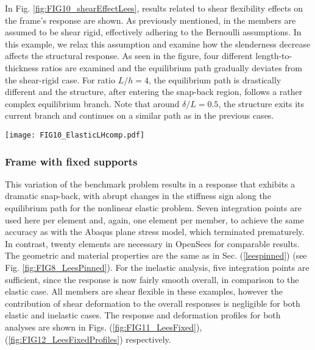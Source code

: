 \begin{figure*}[b]
	\centering
	\qquad
	\caption{Deformation profiles for Lee's frame with pinned supports.}%
	\label{fig:FIG9_LeesPinnedProfiles}%
\end{figure*}
\clearpage
In Fig. \ref{fig:FIG10_shearEffectLees}, results related to shear flexibility
effects on the frame's response are shown.  As previously mentioned, in 
\cite{Lee}
the members are assumed to be shear rigid, effectively adhering to the Bernoulli
assumptions. In this example, we relax this assumption and examine how the
slenderness decrease affects the structural response. As seen in the figure,
four different length-to-thickness ratios are examined and the equilibrium
path gradually deviates from the shear-rigid case. For ratio $L/h=4$, the
equilibrium path is drastically different and the structure, after entering the
snap-back region, follows a rather complex equilibrium branch. Note that around
$\delta/L=0.5$, the structure exits its current branch and continues on a 
similar
path as in the previous cases.

\begin{figure*}[t]
	\centering
	\texttt{[image: FIG10\_ElasticLHcomp.pdf]}
	\caption{Effect of shear flexibility on Lee's frame response. }
	\label{fig:FIG10_shearEffectLees}
\end{figure*}

\subsubsection{Frame with fixed supports}
This variation of the benchmark problem results in a response that exhibits
a dramatic snap-back, with abrupt changes in the stiffness sign along the
equilibrium path for the nonlinear elastic problem.
Seven integration points are used here per element and, again, one element
per member, to achieve the same accuracy as with
the Abaqus plane stress model, which terminated prematurely. 
In contrast, twenty
elements are necessary in OpenSees for comparable results. The geometric
and material properties are the same as in Sec. (\ref{leespinned}) (see Fig.
\ref{fig:FIG8_LeesPinned}). For the inelastic analysis, five integration
points are sufficient, since the response is now fairly smooth overall,
in comparison to the elastic case. All members
are shear flexible in these examples, however the contribution of shear
deformation to the overall responses is negligible for both elastic and
inelastic cases.
The response and deformation profiles for both analyses are shown in Figs.
(\ref{fig:FIG11_LeesFixed}),(\ref{fig:FIG12_LeesFixedProfiles}) respectively.

